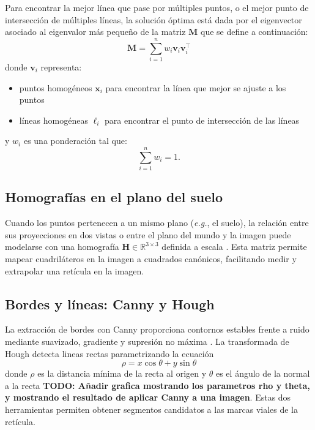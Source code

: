 Para encontrar la mejor línea que pase por múltiples puntos, o el mejor punto de intersección de múltiples líneas, la solución óptima está dada por el eigenvector asociado al eigenvalor más pequeño de la matriz $\mathbf{M}$ \cite{kanatani1998statistical} que se define a continuación:
\begin{equation}
	\mathbf{M} = \sum_{i=1}^{n} w_i \mathbf{v}_i \mathbf{v}_i^\top
\end{equation}
donde $\mathbf{v}_i$ representa:
\begin{itemize}
	\item puntos homogéneos $\mathbf{x}_i$ para encontrar la línea que mejor se ajuste a los puntos
	\item líneas homogéneas $\ell_i$ para encontrar el punto de intersección de las líneas
\end{itemize} y  $w_i$ es una ponderación tal que:
\[
\sum_{i=1}^{n} w_i = 1.
\]

\subsection{Homografías en el plano del suelo}\label{subsec:homografias}

Cuando los puntos pertenecen a un mismo plano (\emph{e.g.}, el suelo),
la relación entre sus proyecciones en  dos vistas o entre el plano del
mundo   y    la   imagen   puede   modelarse    con   una   homografía
\(\mathbf{H}\in\mathbb{R}^{3\times3}\)      definida     a      escala
\cite{hartley2003multiple}. Esta  matriz permite  mapear cuadriláteros
en la imagen a cuadrados canónicos, facilitando medir y extrapolar una
retícula en la imagen.

\subsection{Bordes y líneas: Canny y Hough}\label{sec:canny-hough}

La extracción de bordes con Canny proporciona contornos estables frente a ruido mediante suavizado, gradiente y supresión no máxima \cite{canny1986edge}. La transformada de Hough detecta lineas rectas parametrizando la ecuación\[\rho=x\cos{\theta}+y\sin{\theta}\] donde $\rho$ es la distancia mínima de la recta al origen y $\theta$ es el ángulo de la normal a la recta\cite{DudaEtAl1972} {\bfseries TODO: Añadir grafica mostrando los parametros rho y theta, y mostrando el resultado de aplicar Canny a una imagen}. Estas dos herramientas permiten obtener segmentos candidatos a las marcas viales de la retícula.

